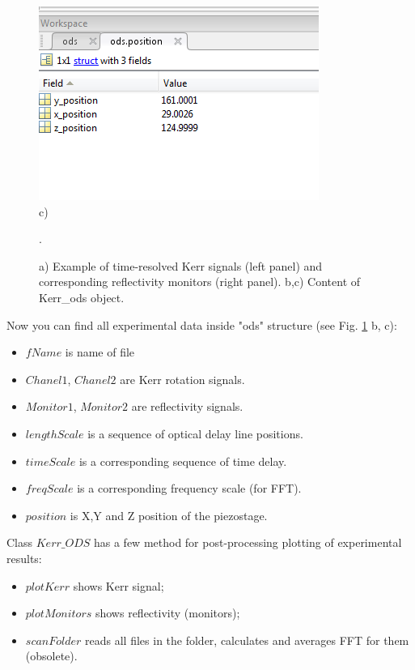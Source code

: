 \documentclass[14pt,a4paper] {article}
\begin{document}
\begin{enumerate}
\begin{figure}
\begin{minipage}{0.5\linewidth}
\includegraphics[width = 1\linewidth]{software3} \\c)
\end{minipage}
\caption{a) Example of time-resolved Kerr signals (left panel) and corresponding reflectivity monitors (right panel). b,c) Content of Kerr_ods object.}.
\label{fig:software1}
\end{figure}

Now you can find all experimental data inside "ods" structure (see Fig. \ref{fig:software1} b, c):     
\begin{itemize}
\item $fName$ is name of file
\item $Chanel1$, $Chanel2$ are Kerr rotation signals.
\item $Monitor1$, $Monitor2$ are reflectivity signals.
\item $lengthScale$ is a sequence of optical delay line positions.
\item $timeScale$ is a corresponding sequence of time delay.
\item $freqScale$ is a corresponding frequency scale (for FFT).
\item $position$ is X,Y and Z position of the piezostage. 
\end{itemize}     
\end{enumerate}

Class $Kerr\_ODS$ has a few method for post-processing plotting of experimental results:
\begin{itemize}
\item $plotKerr$ shows Kerr signal;
\item $plotMonitors$ shows reflectivity (monitors);
\item $scanFolder$ reads all files in the folder, calculates and averages FFT for them (obsolete).
\end{itemize} 
\end{document}
